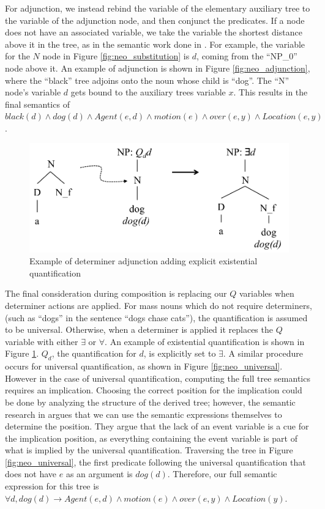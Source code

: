 \documentclass[11pt,a4paper]{article}
\begin{document}
For adjunction, we instead rebind the variable of the elementary auxiliary tree to the variable of the adjunction node, and then conjunct the predicates. If a node does not have an associated variable, we take the variable the shortest distance above it in the tree, as in the semantic work done in \cite{sayeed2012incremental}. For example, the variable for the $N$ node in Figure \ref{fig:neo_substitution} is $d$, coming from the ``NP\_0'' node above it. An example of adjunction is shown in Figure \ref{fig:neo_adjunction}, where the ``black'' tree adjoins onto the noun whose child is ``dog''. The ``N'' node's variable $d$ gets bound to the auxiliary trees variable $x$. This results in the final semantics of $black(d) \land dog(d) \land Agent(e,d) \land motion(e) \land over(e,y) \land Location(e,y)$. 

\begin{figure}[h]
\begin{centering}
    \includegraphics[width=.6\linewidth ]{resources/ch5_resources/neo_existential.pdf}
    \caption{Example of determiner adjunction adding explicit existential quantification}
    \label{fig:neo_existential}
\end{centering}
\end{figure}

The final consideration during composition is replacing our $Q$ variables when determiner actions are applied. For mass nouns which do not require determiners, (such as ``dogs'' in the sentence ``dogs chase cats''), the quantification is assumed to be universal. Otherwise, when a determiner is applied it replaces the $Q$ variable with either $\exists$ or $\forall$. An example of existential quantification is shown in Figure \ref{fig:neo_existential}. $Q_d$, the quantification for $d$, is explicitly set to $\exists$. A similar procedure occurs for universal quantification, as shown in Figure \ref{fig:neo_universal}. However in the case of universal quantification, computing the full tree semantics requires an implication. Choosing the correct position for the implication could be done by analyzing the structure of the derived tree; however, the semantic research in \cite{sayeed2012incremental} argues that we can use the semantic expressions themselves to determine the position. They argue that the lack of an event variable is a cue for the implication position, as everything containing the event variable is part of what is implied by the universal quantification. Traversing the tree in Figure \ref{fig:neo_universal}, the first predicate following the universal quantification that does not have $e$ as an argument is $dog(d)$. Therefore, our full semantic expression for this tree is $\forall d, dog(d) \rightarrow Agent(e,d) \land motion(e) \land over(e,y) \land Location(y)$.
\end{document}
